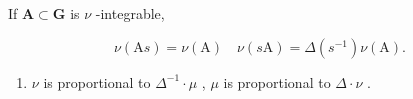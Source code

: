 If \(\mathbf{A}\subset \mathbf{G}\) is \(\nu\) -integrable,

\[
\nu (\mathrm{A} s) = \nu (\mathrm{A}) \quad \nu (s \mathrm{A}) = \Delta (s ^ {- 1}) \nu (\mathrm{A}).
\]

\begin{enumerate}
\def\labelenumi{\arabic{enumi})}
\setcounter{enumi}{2}
\tightlist
\item
  \(\nu\) is proportional to \(\Delta^{-1} \cdot \mu\) , \(\mu\) is proportional to \(\Delta \cdot \nu\) .
\end{enumerate}

